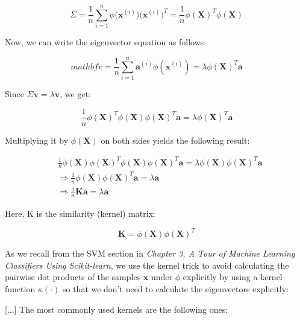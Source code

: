 \documentclass[letterpaper]{report}
\begin{document}
\[
\Sigma = \frac{1}{n} \sum_{i=1}^{n} \phi \big( \mathbf{x}^{(i)} \big) \big( \mathbf{x}^{(i)} \big)^T = \frac{1}{n} \phi ( \mathbf{X})^T \phi (\mathbf{X})
\]

Now, we can write the eigenvector equation as follows:

\[
mathbf{v} = \frac{1}{n} \sum_{i=1}^{n} \mathbf{a}^{(i)} \phi(\mathbf{x}^{(i)}) = \lambda \phi (\mathbf{X})^T \mathbf{a}
\]

Since $\Sigma \mathbf{v} = \lambda \mathbf{v}$, we get:

\[
\frac{1}{n} \phi (\mathbf{X})^T \phi (\mathbf{X}) \phi (\mathbf{X})^T \mathbf{a} = \lambda \phi (\mathbf{X})^T \mathbf{a} 
\]

Multiplying it by $\phi(\mathbf{X})$ on both sides yields the following result:

\begin{equation*} 
\begin{split}
& \frac{1}{n} \phi(\mathbf{X}) \phi(\mathbf{X})^T \phi(\mathbf{X}) \phi(\mathbf{X})^T \mathbf{a} = \lambda \phi(\mathbf{X}) \phi(\mathbf{X})^T \mathbf{a} \\
& \Rightarrow \frac{1}{n} \phi(\mathbf{X}) \phi(\mathbf{X})^T \mathbf{a} = \lambda \mathbf{a} \\
& \Rightarrow \frac{1}{n} \mathbf{Ka} = \lambda \mathbf{a}
\end{split}
\end{equation*} 

Here, K is the similarity (kernel) matrix:

\[
\mathbf{K} = \phi (\mathbf{X}) \phi (\mathbf{X})^T
\]

As we recall from the SVM section in \textit{Chapter 3, A Tour of Machine Learning Classifiers Using Scikit-learn}, we use the kernel trick to avoid calculating the pairwise dot products of the samples $\mathbf{x}$ under $\phi$ explicitly by using a kernel function $\kappa(\cdot)$ so that we don't need to calculate the eigenvectors explicitly:

[...] The most commonly used kernels are the following ones:
\end{document}
